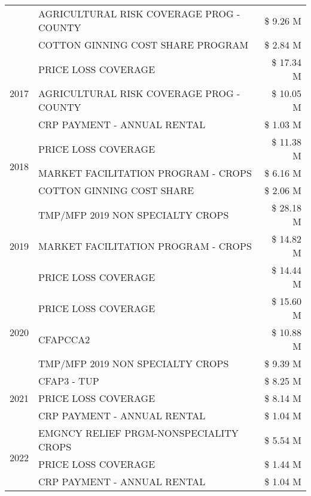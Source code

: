 \begin{tabular}{llr}
 & AGRICULTURAL RISK COVERAGE PROG - COUNTY & \$ 9.26 M \\
 & COTTON GINNING COST SHARE PROGRAM & \$ 2.84 M \\
\cline{1-3}
\multirow[t]{3}{*}{2017} & PRICE LOSS COVERAGE & \$ 17.34 M \\
 & AGRICULTURAL RISK COVERAGE PROG - COUNTY & \$ 10.05 M \\
 & CRP PAYMENT - ANNUAL RENTAL & \$ 1.03 M \\
\cline{1-3}
\multirow[t]{3}{*}{2018} & PRICE LOSS COVERAGE & \$ 11.38 M \\
 & MARKET FACILITATION PROGRAM - CROPS & \$ 6.16 M \\
 & COTTON GINNING COST SHARE & \$ 2.06 M \\
\cline{1-3}
\multirow[t]{3}{*}{2019} & TMP/MFP 2019 NON SPECIALTY CROPS & \$ 28.18 M \\
 & MARKET FACILITATION PROGRAM - CROPS & \$ 14.82 M \\
 & PRICE LOSS COVERAGE & \$ 14.44 M \\
\cline{1-3}
\multirow[t]{3}{*}{2020} & PRICE LOSS COVERAGE & \$ 15.60 M \\
 & CFAPCCA2 & \$ 10.88 M \\
 & TMP/MFP 2019 NON SPECIALTY CROPS & \$ 9.39 M \\
\cline{1-3}
\multirow[t]{3}{*}{2021} & CFAP3 - TUP & \$ 8.25 M \\
 & PRICE LOSS COVERAGE & \$ 8.14 M \\
 & CRP PAYMENT - ANNUAL RENTAL & \$ 1.04 M \\
\cline{1-3}
\multirow[t]{3}{*}{2022} & EMGNCY RELIEF PRGM-NONSPECIALITY CROPS & \$ 5.54 M \\
 & PRICE LOSS COVERAGE & \$ 1.44 M \\
 & CRP PAYMENT - ANNUAL RENTAL & \$ 1.04 M \\
\cline{1-3}
\bottomrule
\end{tabular}
